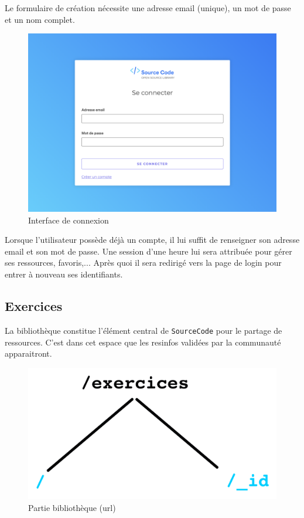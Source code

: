 Le formulaire de création nécessite une adresse email (unique), un mot de passe et un nom complet.


\begin{figure}[H]
    \includegraphics[width=\textwidth,height=0.35\textheight,keepaspectratio]{images/client/login.png}
    \centering
    \caption[SourceCode : interface de connexion]{Interface de connexion}
\end{figure}

Lorsque l'utilisateur possède déjà un compte, il lui suffit de renseigner son adresse email et son mot de passe. Une session d'une heure lui sera attribuée pour gérer ses ressources, favoris,... Après quoi il sera redirigé vers la page de login pour entrer à nouveau ses identifiants.\\


\subsection{Exercices}

La bibliothèque constitue l'élément central de \texttt{SourceCode} pour le partage de ressources. C'est dans cet espace que les \glspl{resinfo} validées par la communauté apparaitront.\\

\begin{figure}[H]
    \includegraphics[width=\textwidth,height=0.1\textheight,keepaspectratio]{images/client/exercices.jpeg}
    \centering
    \caption[SourceCode : partie bibliothèque]{Partie bibliothèque (url)}
\end{figure}

